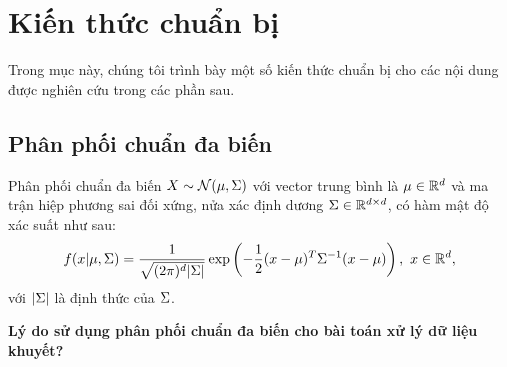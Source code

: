 \section{Kiến thức chuẩn bị}

Trong mục này, chúng tôi trình bày một số kiến thức chuẩn bị cho các nội dung được nghiên cứu trong các phần sau.

\subsection{Phân phối chuẩn đa biến}
Phân phối chuẩn đa biến $X \sim \mathcal{N}(\mu, \Sigma)$ với vector trung bình là $\mu \in \mathbb R^d$ và ma trận hiệp phương sai đối xứng, nửa xác định dương $\Sigma \in \mathbb R^{d \times d}$, có 
hàm mật độ xác suất
như sau:
\[
    f(x | \mu, \Sigma) 
    = \frac{1}{\sqrt{(2\pi)^{d} |\Sigma|}}  \exp \left(- \frac{1}{2} (x - \mu)^{T} \Sigma^{-1}  (x - \mu)\right), \ x \in \mathbb R^d,
\]
với $|\Sigma|$ là định thức của $\Sigma$.

\textbf{Lý do sử dụng phân phối chuẩn đa biến cho bài toán xử lý dữ liệu khuyết?}

